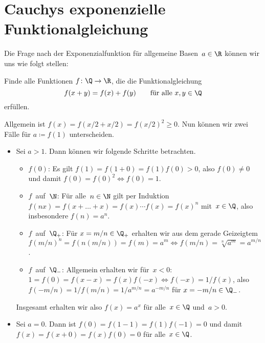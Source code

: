 \documentclass[a4paper]{article}
\begin{document}
\section{Cauchys exponenzielle Funktionalgleichung}

Die Frage nach der Exponenzialfunktion für allgemeine Basen~$a \in \R$ können wir uns wie folgt stellen:

\begin{problem}
Finde alle Funktionen $f\colon \Q \to \R$, die die Funktionalgleichung
\begin{equation*}
    f(x+y) = f(x)+f(y) \qquad\text{für alle } x,y \in \Q
\end{equation*}
erfüllen.
\end{problem}

\begin{solution}
    Allgemein ist $f(x) = f(x/2+x/2) = f(x/2)^2 \geq 0$. Nun können wir zwei Fälle für $a \coloneqq f(1)$ unterscheiden.
    \begin{itemize}
        \item Sei $a > 1$. Dann können wir folgende Schritte betrachten.
              \begin{itemize}
                  \item $f(0)$: Es gilt $f(1) = f(1+0) = f(1)f(0) > 0$, also $f(0) \neq 0$ und damit $f(0) = f(0)^2 \iff f(0) = 1$.
                  \item $f$~auf~$\N$: Für alle~$n \in \N$ gilt per Induktion $f(nx) = f(x+\dots+x) = f(x)\cdots f(x) = f(x)^n$ mit~$x \in \Q$, also insbesondere $f(n) = a^n$.
                  \item $f$~auf~$\Q_+$: Für $x = m/n \in \Q_+$ erhalten wir aus dem gerade Geizeigtem $f(m/n)^n = f(n(m/n)) = f(m) = a^m \iff f(m/n) = \sqrt[n]{a^m} = a^{m/n}$.
                  \item $f$~auf~$\Q_-$: Allgemein erhalten wir für~$x < 0$: $1 = f(0) = f(x-x) = f(x)f(-x) \iff f(-x) = 1/f(x)$, also $f(-m/n) = 1/f(m/n) = 1/a^{m/n} = a^{-m/n}$ für $x = -m/n \in \Q_-$.
              \end{itemize}
              Insgesamt erhalten wir also $f(x) = a^x$ für alle~$x \in \Q$ und~$a > 0$.
        \item Sei $a = 0$. Dann ist $f(0) = f(1-1) = f(1)f(-1) = 0$ und damit $f(x) = f(x+0) = f(x)f(0) = 0$ für alle~$x \in \Q$.
    \end{itemize}
\end{solution}
\end{document}
